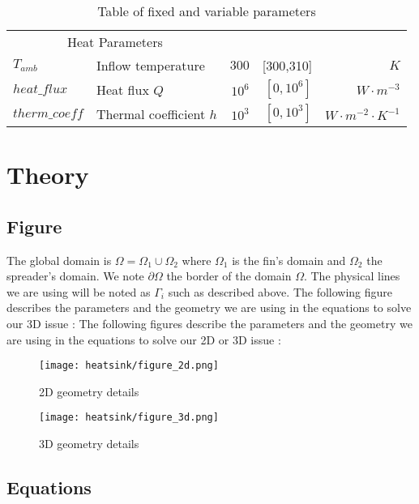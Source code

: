 \begin{table}[htbp]
\begin{tabular}{@{}llrrr@{}}
\multicolumn{2}{c}{Heat Parameters} \\ \cmidrule(r){1-2}
$T_{amb}$ & Inflow temperature & $300$ & [300,310] & $K$ \\
$heat\_flux$ & Heat flux $Q$ & $10^6$ & $[0 ,10^{6}]$ & $W \cdot m^{-3}$\\
$therm\_coeff$ & Thermal coefficient $h$ & $10^3$ & $[0,10^3]$ & $W\cdot m^{-2} \cdot K^{-1}$ \\
\end{tabular}

  \caption{Table of fixed and variable parameters}
  \label{tab:param}
\end{table}


\section{Theory}
\label{therm:equations}

\subsection{Figure}
The global domain is $\varOmega = \varOmega_1 \cup \varOmega_2 $ where $\varOmega_1$ is the fin's domain and $\varOmega_2$ the spreader's domain. We note $\partial\varOmega$ the border of the domain $\varOmega$. The physical lines we are using will be noted as $\Gamma_i$ such as described above. The following figure describes the parameters and the geometry we are using in the equations to solve our 3D issue :
The following figures describe the parameters and the geometry we are using in the equations to solve our 2D or 3D issue :
\begin{figure}[!h]
\centering
\texttt{[image: heatsink/figure\_2d.png]}
\caption{2D geometry details}
\end{figure}

\begin{figure}[!h]
\centering
\texttt{[image: heatsink/figure\_3d.png]}
\caption{3D geometry details}
\end{figure}
\clearpage

\subsection{Equations}

